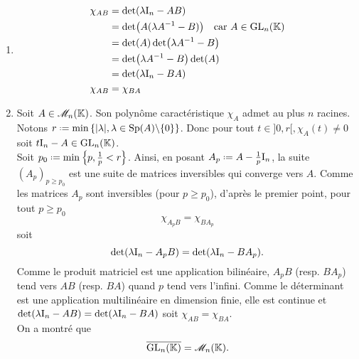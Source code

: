 \begin{solution}
    \begin{enumerate}
        \item \begin{align*}
        \chi_{AB} &= \det(\lambda \mathrm{I}_n - AB) \\
        &= \det(A(\lambda A^{-1} - B)) \quad \text{car } A \in \mathrm{GL}_n(\mathbb{K}) \\
        &= \det(A) \det(\lambda A^{-1} - B) \\
        &= \det(\lambda A^{-1} - B) \det(A) \\
        &= \det(\lambda \mathrm{I}_n - BA) \\
        \chi_{AB} &= \chi_{BA}
    \end{align*}
    \item Soit $A \in \mathscr{M}_n(\mathbb{K})$. Son polynôme caractéristique $\chi_A$ admet au plus $n$ racines. \\
    Notons $r \defeq \min \left\{ |\lambda|, \lambda \in \Sp(A) \backslash \{0\} \right\}$. Donc pour tout $t \in ]0,r[, \chi_A(t) \not=0$ soit $t \mathrm{I}_n - A \in \mathrm{GL}_n(\mathbb{K})$. \\
    Soit $p_0 \defeq \min \left\{ p, \frac{1}{p} < r \right\}$. Ainsi, en posant $A_p \defeq A - \frac{1}{p} \I_n$, la suite $(A_p)_{p \geqslant p_0}$ est une suite de matrices inversibles qui converge vers $A$. Comme les matrices $A_p$ sont inversibles (pour $p \geqslant p_0$), d'après le premier point, pour tout $p \geqslant p_0$
    $$\chi_{A_p B} = \chi_{B A_p}$$
    soit 
    $$\det(\lambda \mathrm{I}_n - A_p B) = \det(\lambda \mathrm{I}_n - B A_p).$$
    Comme le produit matriciel est une application bilinéaire, $A_p B$ (resp. $B A_p$) tend vers $AB$ (resp. $BA$) quand $p$ tend vers l'infini. Comme le déterminant est une application multilinéaire en dimension finie, elle est continue et $\det(\lambda \mathrm{I}_n - A B) = \det(\lambda \mathrm{I}_n - B A)$ soit $\chi_{A B} = \chi_{B A}$. \\
    On a montré que 
    $$\overline{\mathrm{GL}_n(\mathbb{K})} = \mathscr{M}_n(\mathbb{K}).$$
    \end{enumerate}
\end{solution}